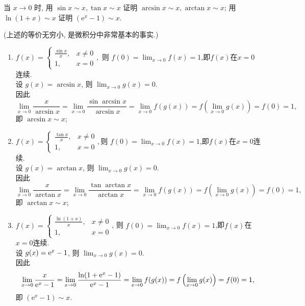 \begin{exercise}[2.1.16]
    当 $x \to 0$ 时, 用 $\sin x \sim x, \tan x \sim x$ 证明 $\arcsin x \sim x, \arctan x \sim x$; 用 $\ln(1+x) \sim x$ 证明 $(\mathrm{e}^x-1) \sim x$.

    (上述的等价无穷小, 是微积分中非常基本的事实.)
\end{exercise}

\begin{solution}
    \begin{enumerate}
        \item $f(x) = \begin{cases}
            \frac{\sin x}{x},&x\neq 0\\
            1,&x=0
        \end{cases},$ 则 $f(0)=\lim_{x \to 0} f(x) = 1$,即$f(x)$在$x=0$连续.\\ 
        设 $g(x) = \arcsin x$, 则 $\lim_{x \to 0} g(x) = 0$. \\
        因此$$\lim_{x \to 0} \frac{x}{\arcsin x } = \lim_{x \to 0} \frac{\sin  \arcsin x}{\arcsin x }= \lim_{x \to 0} f(g(x)) = f \left( \lim_{x \to 0} g(x) \right) = f(0) = 1,$$ 
        即 $\arcsin x \sim x$;
        \item $f(x) = \begin{cases}
            \frac{\tan x}{x},&x\neq 0\\
            1,&x=0
        \end{cases},$则 $f(0)=\lim_{x \to 0} f(x) = 1$,即$f(x)$在$x=0$连续.\\ 
        设 $g(x) = \arctan x$, 则 $\lim_{x \to 0} g(x) = 0$.\\
         因此$$\lim_{x \to 0} \frac{x}{\arctan x} = \lim_{x \to 0} \frac{\tan \arctan x}{\arctan x}=\lim_{x \to 0} f(g(x)) = f \left( \lim_{x \to 0} g(x) \right) = f(0) = 1,$$
         即 $\arctan x \sim x$;
        \item $f(x) = \begin{cases}
            \frac{\ln(1+x)}{x},&x\neq 0\\
            1,&x=0
        \end{cases}$, 则 $f(0)=\lim_{x \to 0} f(x) = 1$,即$f(x)$在$x=0$连续.\\ 
         设 $g(x) = \mathrm{e}^x - 1$, 则 $\lim_{x \to 0} g(x) = 0$.\\
        因此$$\lim_{x \to 0} \frac{x}{\mathrm{e}^x-1}=\lim_{x \to 0} \frac{\ln(1+\mathrm{e}^{x}-1)}{\mathrm{e}^x-1} = \lim_{x \to 0} f(g(x)) = f \left( \lim_{x \to 0} g(x) \right) = f(0) = 1, $$即 $(\mathrm{e}^x - 1) \sim x$.
    \end{enumerate}
\end{solution}

